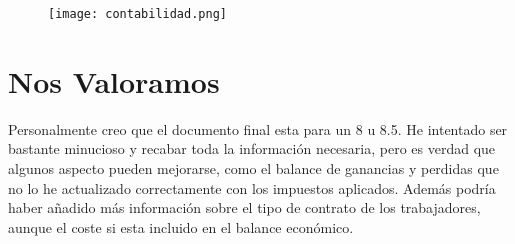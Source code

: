 \begin{figure}[H]
    \centering
    \texttt{[image: contabilidad.png]}
\end{figure}

\section{Nos Valoramos}
Personalmente creo que el documento final esta para un 8 u 8.5. He intentado ser bastante minucioso y recabar toda la información necesaria, pero es verdad que algunos aspecto pueden mejorarse, como el balance de ganancias y perdidas que no lo he actualizado correctamente con los impuestos aplicados. Además podría haber añadido más información sobre el tipo de contrato de los trabajadores, aunque el coste si esta incluido en el balance económico.


%
%


